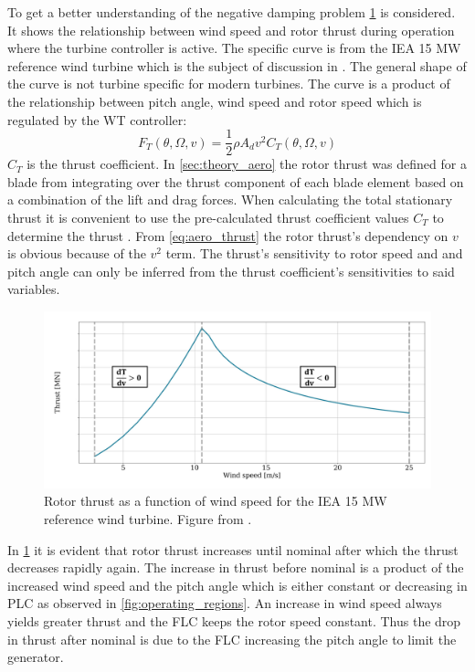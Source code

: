 \smallskip
To get a better understanding of the negative damping problem \cref{fig:thrust_vs_windspeed} is considered. It shows the relationship between wind speed and rotor thrust during operation where the turbine controller is active. The specific curve is from the IEA 15 MW reference wind turbine which is the subject of discussion in \cite{Vanelli2021}. The general shape of the curve is not turbine specific for modern turbines. The curve is a product of the relationship between pitch angle, wind speed and rotor speed which is regulated by the WT controller:
\begin{equation} \label{eq:aero_thrust}
	F_T(\theta, \Omega, v) = \dfrac{1}{2} \rho A_d v^2 C_T(\theta, \Omega, v)
\end{equation}
$ C_T $ is the thrust coefficient. In \cref{sec:theory_aero} the rotor thrust was defined for a blade from integrating over the thrust component of each blade element based on a combination of the lift and drag forces. When calculating the total stationary thrust it is convenient to use the pre-calculated thrust coefficient values $ C_T $ to determine the thrust \cite{Knudsen2013}. From \cref{eq:aero_thrust} the rotor thrust's dependency on $ v $ is obvious because of the $ v^2 $ term. The thrust's sensitivity to rotor speed and and pitch angle can only be inferred from the thrust coefficient's sensitivities to said variables. 
\begin{figure}[ht]
	\centering
	\includegraphics[width=0.85\linewidth]{Graphics/ThrustWindpeedCurve.PNG}
	\caption{Rotor thrust as a function of wind speed for the IEA 15 MW reference wind turbine. Figure from \cite{Vanelli2021}.}
	\label{fig:thrust_vs_windspeed}
\end{figure}
In \cref{fig:thrust_vs_windspeed} it is evident that rotor thrust increases until nominal after which the thrust decreases rapidly again. The increase in thrust before nominal is a product of the increased wind speed and the pitch angle which is either constant or decreasing in PLC as observed in \cref{fig:operating_regions}. An increase in wind speed always yields greater thrust and the FLC keeps the rotor speed constant. Thus the drop in thrust after nominal is due to the FLC increasing the pitch angle to limit the generator.

